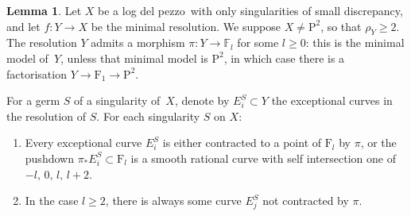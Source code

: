 \documentclass[11pt]{report}
\theoremstyle{definition}
\theoremstyle{definition}
\theoremstyle{definition}
\theoremstyle{definition}
\theoremstyle{definition}
\newtheorem{lem}[thm]{Lemma}
\theoremstyle{definition}
\theoremstyle{definition}
\theoremstyle{definition}
\newcommand{\ldp}{log del pezzo}
\newcommand{\minres}{minimal resolution}
\newcommand{\F}{\mathrm{F}}
\renewcommand{\P}{\mathrm{P}}
\begin{document}
\begin{lem}
Let $X$ be a \ldp\ with only singularities of small discrepancy, and
let $f \colon Y \rightarrow X$ be the \minres. We suppose $X\not=\P^2$, so that $\rho_Y\ge2$.
The resolution $Y$ admits a morphism $\pi \colon Y \rightarrow \mathbb{F}_l$ for some $l\ge0$:
this is the minimal model of~$Y$, unless that minimal model
is $\P^2$, in which case there is a factorisation
$Y\rightarrow \F_1\rightarrow\P^2$.

For a germ $S$ of a singularity of~$X$, denote by
$E_i^S \subset Y$ the exceptional curves in the resolution of $S$.
For each singularity $S$ on $X$:
\begin{enumerate}
\item
Every exceptional curve $E_i^S$ is either contracted to a point of $\F_l$ by $\pi$,
or the pushdown
$\pi_* E_i^S\subset\F_l$ is a smooth rational curve with self intersection one of $-l, \,0, \, l, \, l+2$.
\item
In the case $l\ge2$, there is always some curve $E_j^S$ not contracted by $\pi$.
\end{enumerate}

\end{lem}
\end{document}
